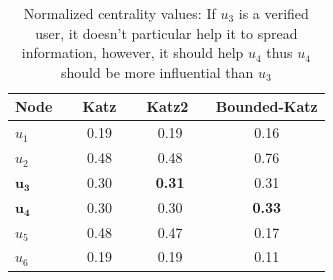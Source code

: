 \documentclass[envcountsame]{llncs}
\begin{document}
\begin{table}
\centering
\begin{tabular}{ lccc}
\hline
Node~ & ~Katz~ & ~Katz2 ~ & Bounded-Katz \\ \hline
  $u_1$ & 0.19 &0.19  &0.16\\ \hline
 $u_2$ &0.48  &0.48   &0.76\\ \hline
$\bm{u_3}$& 0.30 & \textbf{0.31} &0.31\\ \hline 
$\bm{u_4}$ &0.30 &0.30   &\textbf{0.33}\\ \hline 
$u_5$ & 0.48 &  0.47&0.17\\ \hline 
$u_6$ & 0.19 & 0.19&0.11\\ \hline 
\end{tabular}
\caption{Normalized centrality values: If $u_3$ is a verified user, it doesn't particular help it to spread information, however, it should help $u_4$ thus $u_4$ should be more influential than $u_3$}
\end{table}
\end{document}
